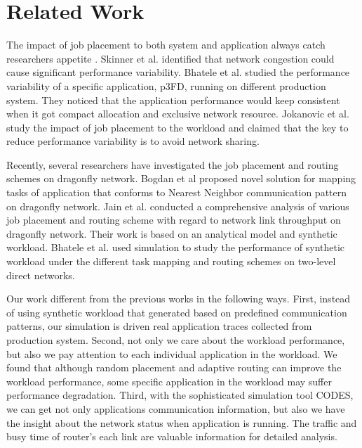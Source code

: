 \documentclass[conference,compsoc]{IEEEtran}
\begin{document}
\section{Related Work}
\label{sec:related work}

The impact of job placement to both system and application always catch researchers appetite \cite{dskinner} \cite{abhinav-sc13} \cite{jose-ipdps15}. Skinner et al.\cite{dskinner} identified that network congestion could cause significant performance variability. Bhatele et al. \cite{abhinav-sc13} studied the performance variability of a specific application, p3FD, running on different production system. They noticed that the application performance would keep consistent when it got compact allocation and exclusive network resource. Jokanovic et al.\cite{jose-ipdps15} study the impact of job placement to the workload and claimed that the key to reduce performance variability is to avoid network sharing. 

Recently, several researchers have investigated the job placement and routing schemes on dragonfly network. Bogdan et al \cite{hoefler-hpdc14} proposed novel solution for mapping tasks of application that conforms to Nearest Neighbor communication pattern on dragonfly network. Jain et al. \cite{jain-sc14} conducted a comprehensive analysis of various job placement and routing scheme with regard to network link throughput on dragonfly network. Their work is based on an analytical model and synthetic workload. Bhatele et al.\cite{bhatele-sc11} used simulation to study the performance of synthetic workload under the different task mapping and routing schemes on two-level direct networks.


Our work different from the previous works in the following ways. First, instead of using synthetic workload that generated based on predefined communication patterns, our simulation is driven real application traces collected from production system. Second, not only we care about the workload performance, but also we pay attention to each individual application in the workload. We found that although random placement and adaptive routing can improve the workload performance, some specific application in the workload may suffer performance degradation. Third, with the sophisticated simulation tool CODES, we can get not only applications communication information, but also we have the insight about the network status when application is running. The traffic and busy time of router's each link are valuable information for detailed analysis.
\end{document}
